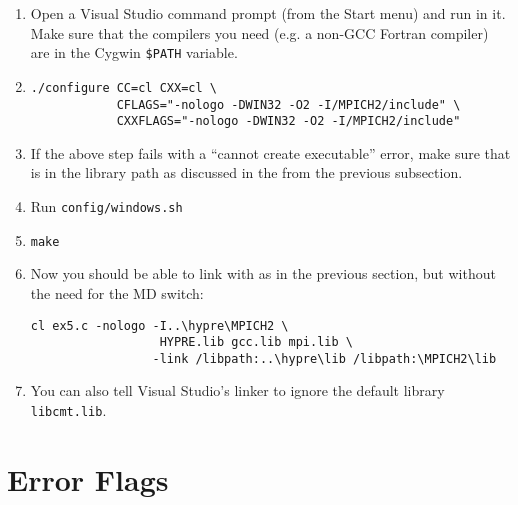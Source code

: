 \begin{enumerate}
\item Open a Visual Studio command prompt (from the Start menu) and run
 in it. Make sure that the compilers you need (e.g. a non-GCC
Fortran compiler) are in the Cygwin \verb|$PATH| variable.
\item
\begin{verbatim}
./configure CC=cl CXX=cl \
            CFLAGS="-nologo -DWIN32 -O2 -I/MPICH2/include" \
            CXXFLAGS="-nologo -DWIN32 -O2 -I/MPICH2/include"
\end{verbatim}
\item If the above step fails with a ``cannot create executable'' error, make
sure that  is in the library path as discussed in the
\kbd{CL.exe} from the previous subsection.
\item Run \verb|config/windows.sh|
\item \verb|make|
\item Now you should be able to link with \hypre{} as in the previous section,
but without the need for the MD switch:
\begin{verbatim}
cl ex5.c -nologo -I..\hypre\MPICH2 \
                  HYPRE.lib gcc.lib mpi.lib \
                 -link /libpath:..\hypre\lib /libpath:\MPICH2\lib
\end{verbatim}
\item You can also tell Visual Studio's linker to ignore the default library
\verb|libcmt.lib|.
\end{enumerate}


\section{Error Flags}

